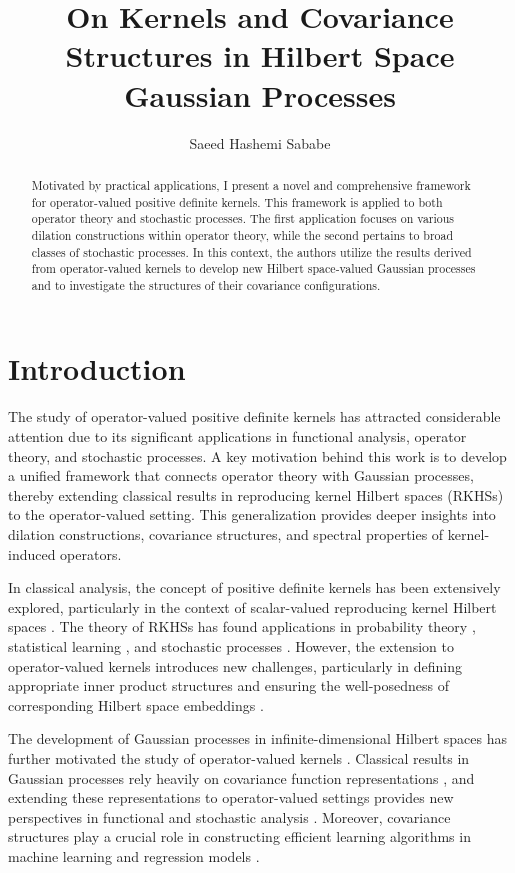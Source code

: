 \documentclass[11pt]{amsart}
\title[On Kernels and Covariance Structures in Hilbert Space ... ]{On Kernels and Covariance Structures in Hilbert Space Gaussian Processes}
\author[S. Hashemi Sababe]{Saeed Hashemi Sababe}
\theoremstyle{definition}
\numberwithin{equation}{section}
\begin{document}
\begin{abstract}
Motivated by practical applications, I present a novel and comprehensive framework for operator-valued positive definite kernels. This framework is applied to both operator theory and stochastic processes. The first application focuses on various dilation constructions within operator theory, while the second pertains to broad classes of stochastic processes. In this context, the authors utilize the results derived from operator-valued kernels to develop new Hilbert space-valued Gaussian processes and to investigate the structures of their covariance configurations.
\end{abstract}

\maketitle

\section{Introduction}

The study of operator-valued positive definite kernels has attracted considerable attention due to its significant applications in functional analysis, operator theory, and stochastic processes. A key motivation behind this work is to develop a unified framework that connects operator theory with Gaussian processes, thereby extending classical results in reproducing kernel Hilbert spaces (RKHSs) to the operator-valued setting. This generalization provides deeper insights into dilation constructions, covariance structures, and spectral properties of kernel-induced operators.

In classical analysis, the concept of positive definite kernels has been extensively explored, particularly in the context of scalar-valued reproducing kernel Hilbert spaces \cite{Aronszajn1950, Saitoh2016,Chen2023,Nguyen2023}. The theory of RKHSs has found applications in probability theory \cite{Karatzas1991,Kumar2023,Martinez2023}, statistical learning \cite{Scholkopf2001}, and stochastic processes \cite{Doob1953}. However, the extension to operator-valued kernels introduces new challenges, particularly in defining appropriate inner product structures and ensuring the well-posedness of corresponding Hilbert space embeddings \cite{Jorgensen2024, Rasmussen2006,Baker2023,Gupta2023,Huang2023}.

The development of Gaussian processes in infinite-dimensional Hilbert spaces has further motivated the study of operator-valued kernels \cite{Kailath1971,Owen2023}. Classical results in Gaussian processes rely heavily on covariance function representations \cite{Parzen1961}, and extending these representations to operator-valued settings provides new perspectives in functional and stochastic analysis \cite{Ledoux1991, Stroock2011}. Moreover, covariance structures play a crucial role in constructing efficient learning algorithms in machine learning \cite{Izenman2008} and regression models \cite{Shiryaev1996,Liu2023}.
\end{document}
